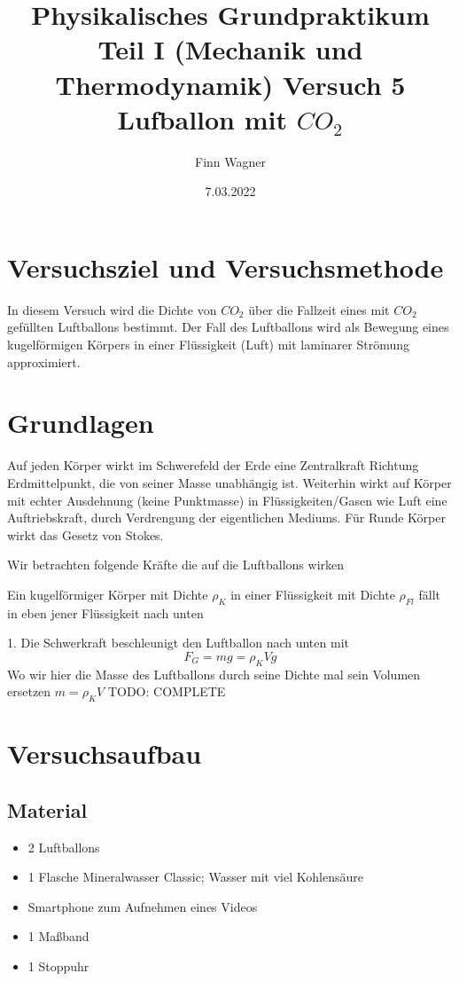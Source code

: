 \documentclass{article}
\date{7.03.2022}
\title{Physikalisches Grundpraktikum Teil I (Mechanik und Thermodynamik) Versuch 5 Lufballon mit \(CO_2\)}
\author{Finn Wagner}
\begin{document}
    \maketitle

    \section{Versuchsziel und Versuchsmethode}
    In diesem Versuch wird die Dichte von \(CO_2\) über die Fallzeit eines mit \(CO_2\) gefüllten Luftballons bestimmt.
    Der Fall des Luftballons wird als Bewegung eines kugelförmigen Körpers in einer Flüssigkeit (Luft) mit laminarer Strömung approximiert.

    \section{Grundlagen}
    Auf jeden Körper wirkt im Schwerefeld der Erde eine Zentralkraft Richtung Erdmittelpunkt, die von seiner Masse unabhängig ist.
    Weiterhin wirkt auf Körper mit echter Ausdehnung (keine Punktmasse) in Flüssigkeiten/Gasen wie Luft eine Auftriebskraft, 
    durch Verdrengung der eigentlichen Mediums.
    Für Runde Körper wirkt das Gesetz von Stokes.

    Wir betrachten folgende Kräfte die auf die Luftballons wirken

    Ein kugelförmiger Körper mit Dichte \(\rho_K\) in einer Flüssigkeit mit Dichte \(\rho_{Fl}\) fällt in eben jener Flüssigkeit nach unten

    1. Die Schwerkraft beschleunigt den Luftballon nach unten mit
    \[ F_G = mg = \rho_K V g \]
    Wo wir hier die Masse des Luftballons durch seine Dichte mal sein Volumen ersetzen \( m = \rho_K V \)
    TODO: COMPLETE

    \section{Versuchsaufbau}
        \subsection{Material}
        \begin{itemize}
            \item 2 Luftballons
            \item 1 Flasche Mineralwasser Classic; Wasser mit viel Kohlensäure
            \item Smartphone zum Aufnehmen eines Videos
            \item 1 Maßband
            \item 1 Stoppuhr
        \end{itemize}
\end{document}
